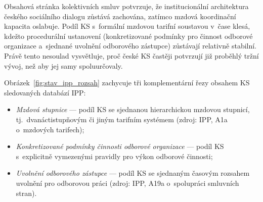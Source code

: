 Obsahová stránka kolektivních smluv potvrzuje, že institucionální architektura českého sociálního dialogu zůstává zachována, zatímco mzdová koordinační kapacita oslabuje. Podíl \acs{KS} s~formální mzdovou tarifní soustavou v~čase klesá, kdežto procedurální ustanovení (konkretizované podmínky pro činnost odborové organizace a~sjednané uvolnění odborového zástupce) zůstávají relativně stabilní. Právě tento nesoulad vysvětluje, proč české \ac{KS} častěji potvrzují již proběhlý tržní vývoj, než aby jej samy spoluurčovaly.
\par
Obrázek~\ref{fig:stav_ipp_rozsah} zachycuje tři komplementární řezy obsahem \acs{KS} sledovaných databází \ac{IPP}:
\begin{itemize}[noitemsep]
  \item \emph{Mzdová stupnice} --- podíl \acs{KS} se sjednanou hierarchickou mzdovou stupnicí, tj.\ dvanáctistupňovým či jiným tarifním systémem (zdroj: \acs{IPP}, A1a o~mzdových tarifech);
  \item \emph{Konkretizované podmínky činnosti odborové organizace} --- podíl \acs{KS} s~explicitně vymezenými pravidly pro výkon odborové činnosti;
  \item \emph{Uvolnění odborového zástupce} --- podíl \acs{KS} se sjednaným časovým rozsahem uvolnění pro odborovou práci (zdroj: \acs{IPP}, A19a o~spolupráci smluvních stran).
\end{itemize}



